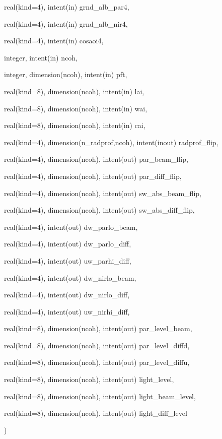 {\begin{DoxyParamCaption}
\item[{real(kind=4), intent(in)}]{grnd\+\_\+alb\+\_\+par4, }
\item[{real(kind=4), intent(in)}]{grnd\+\_\+alb\+\_\+nir4, }
\item[{real(kind=4), intent(in)}]{cosaoi4, }
\item[{integer, intent(in)}]{ncoh, }
\item[{integer, dimension(ncoh), intent(in)}]{pft, }
\item[{real(kind=8), dimension(ncoh), intent(in)}]{lai, }
\item[{real(kind=8), dimension(ncoh), intent(in)}]{wai, }
\item[{real(kind=8), dimension(ncoh), intent(in)}]{cai, }
\item[{real(kind=4), dimension(n\+\_\+radprof,ncoh), intent(inout)}]{radprof\+\_\+flip, }
\item[{real(kind=4), dimension(ncoh), intent(out)}]{par\+\_\+beam\+\_\+flip, }
\item[{real(kind=4), dimension(ncoh), intent(out)}]{par\+\_\+diff\+\_\+flip, }
\item[{real(kind=4), dimension(ncoh), intent(out)}]{sw\+\_\+abs\+\_\+beam\+\_\+flip, }
\item[{real(kind=4), dimension(ncoh), intent(out)}]{sw\+\_\+abs\+\_\+diff\+\_\+flip, }
\item[{real(kind=4), intent(out)}]{dw\+\_\+parlo\+\_\+beam, }
\item[{real(kind=4), intent(out)}]{dw\+\_\+parlo\+\_\+diff, }
\item[{real(kind=4), intent(out)}]{uw\+\_\+parhi\+\_\+diff, }
\item[{real(kind=4), intent(out)}]{dw\+\_\+nirlo\+\_\+beam, }
\item[{real(kind=4), intent(out)}]{dw\+\_\+nirlo\+\_\+diff, }
\item[{real(kind=4), intent(out)}]{uw\+\_\+nirhi\+\_\+diff, }
\item[{real(kind=8), dimension(ncoh), intent(out)}]{par\+\_\+level\+\_\+beam, }
\item[{real(kind=8), dimension(ncoh), intent(out)}]{par\+\_\+level\+\_\+diffd, }
\item[{real(kind=8), dimension(ncoh), intent(out)}]{par\+\_\+level\+\_\+diffu, }
\item[{real(kind=8), dimension(ncoh), intent(out)}]{light\+\_\+level, }
\item[{real(kind=8), dimension(ncoh), intent(out)}]{light\+\_\+beam\+\_\+level, }
\item[{real(kind=8), dimension(ncoh), intent(out)}]{light\+\_\+diff\+\_\+level}
\end{DoxyParamCaption}
)}\hypertarget{multiple__scatter_8f90_a2a48cb88f4cbc8013f2b09b2fc878d1b}{}\label{multiple__scatter_8f90_a2a48cb88f4cbc8013f2b09b2fc878d1b}


